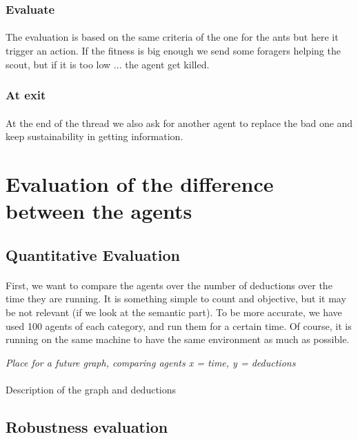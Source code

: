 \documentclass{article}
\begin{document}
		\subsubsection{Evaluate}
			\paragraph{}
			The evaluation is based on the same criteria of the one for the ants but here it trigger an action.
			If the fitness is big enough we send some foragers helping the scout, but if it is too low ... the agent get killed.
		\subsubsection{At exit}
			\paragraph{}
			At the end of the thread we also ask for another agent to replace the bad one and keep sustainability in getting information.
			
\section{Evaluation of the difference between the agents}
	\subsection{Quantitative Evaluation}
		\paragraph{}
			First, we want to compare the agents over the number of deductions over the time they are running.
			It is something simple to count and objective, but it may be not relevant (if we look at the semantic part).
			To be more accurate, we have used 100 agents of each category, and run them for a certain time.
			Of course, it is running on the same machine to have the same environment as much as possible.
		\begin{center}
			\textit{Place for a future graph, comparing agents x = time, y = deductions}
		\end{center}
		\paragraph{}
			Description of the graph and deductions
	\subsection{Robustness evaluation}
\end{document}
